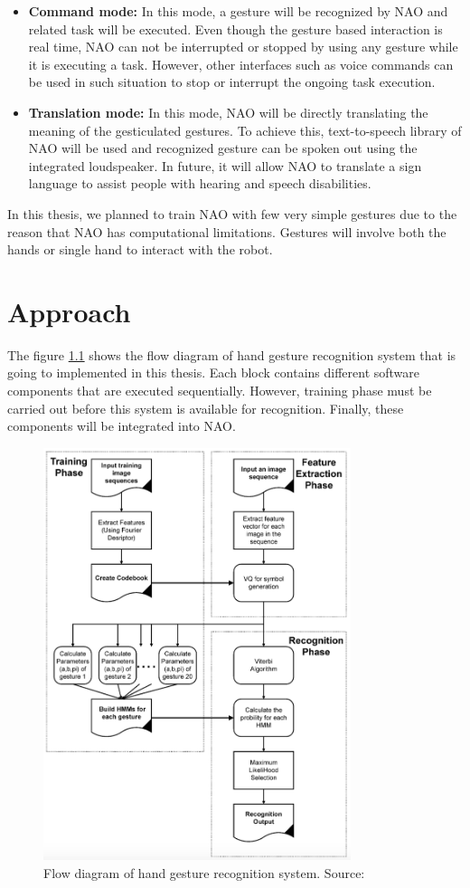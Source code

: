 \begin{itemize}
	\item \textbf{Command mode:} In this mode, a gesture will be recognized by NAO and related task will be executed. Even though the gesture based interaction is real time, NAO can not be interrupted or stopped by using any gesture while it is executing a task. However, other interfaces such as voice commands can be used in such situation to stop or interrupt the ongoing task execution.
	\item \textbf{Translation mode:} In this mode, NAO will be directly translating the meaning of the gesticulated gestures. To achieve this, text-to-speech library of NAO will be used and recognized gesture can be spoken out using the integrated loudspeaker. In future, it will allow NAO to translate a sign language to assist people with hearing and speech disabilities.
\end{itemize}

In this thesis, we planned to train NAO with few very simple gestures due to the reason that NAO has computational limitations. Gestures will involve both the hands or single hand to interact with the robot.

\chapter{Approach} The figure \ref{fig:flow} shows the flow diagram of hand gesture recognition system that is going to implemented in this thesis. Each block contains different software components that are executed sequentially. However, training phase must be carried out before this system is available for recognition. Finally, these components will be integrated into NAO.

\begin{figure}
	[!h] \centering 
	\includegraphics[width=9cm]{figures/flow.png} \caption{Flow diagram of hand gesture recognition system. Source: \cite{5}} \label{fig:flow} 
\end{figure}


